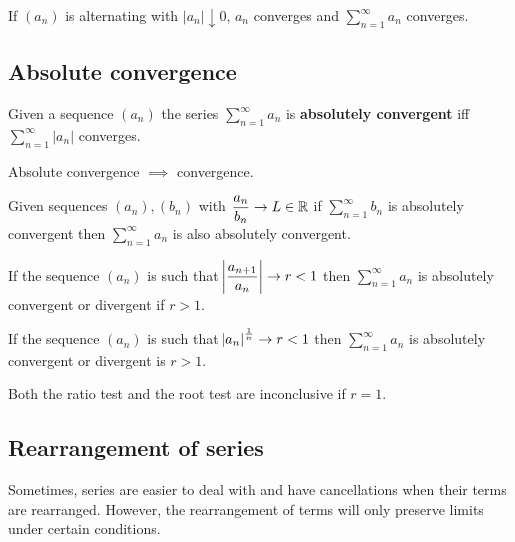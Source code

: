 \documentclass[../Year1.tex]{subfiles}
\begin{document}
\begin{theorem}
    If $(a_n)$ is alternating with $|a_n|\downarrow 0$, $a_n$ converges and $\displaystyle\sum_{n=1}^\infty a_n$ converges.
\end{theorem}

\subsection{Absolute convergence}

\begin{definition}
    Given a sequence $(a_n)$ the series $\displaystyle\sum_{n=1}^\infty a_n$ is \textbf{absolutely convergent} iff $\displaystyle\sum_{n=1}^\infty |a_n|$ converges.
\end{definition}

\begin{theorem}
    Absolute convergence $\implies$ convergence.
\end{theorem}

\begin{theorem}
    Given sequences $(a_n),(b_n)$ with $\displaystyle \frac{a_n}{b_n}\rightarrow L\in\mathbb{R}$ if $\displaystyle\sum_{n=1}^\infty b_n$ is absolutely convergent then $\displaystyle\sum_{n=1}^\infty a_n$ is also absolutely convergent.
\end{theorem}

\begin{theorem}
    If the sequence $(a_n)$ is such that $\displaystyle\abs{\frac{a_{n+1}}{a_n}}\rightarrow r<1$ then $\displaystyle\sum_{n=1}^\infty a_n$ is absolutely convergent or divergent if $r>1$.
\end{theorem}

\begin{theorem}
    If the sequence $(a_n)$ is such that $\displaystyle\abs{a_n}^{\frac{1}{n}}\rightarrow r<1$ then $\displaystyle\sum_{n=1}^\infty a_n$ is absolutely convergent or divergent is $r>1$.
\end{theorem}

\begin{remark}
    Both the ratio test and the root test are inconclusive if $r=1$.
\end{remark}

\subsection{Rearrangement of series}
Sometimes, series are easier to deal with and have cancellations when their terms are rearranged. However, the rearrangement of terms will only preserve limits under certain conditions.
\end{document}
